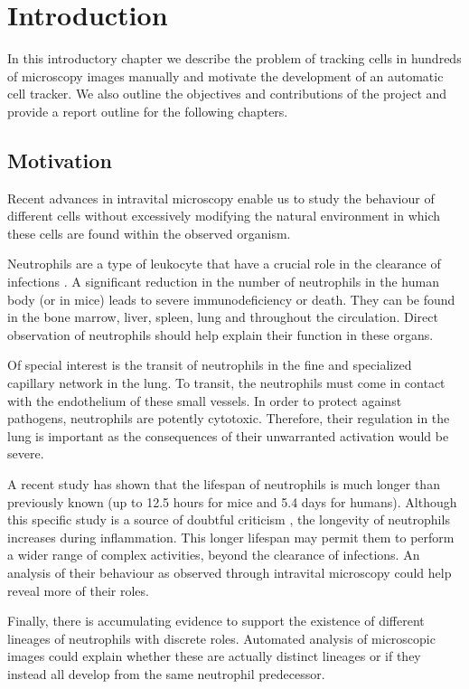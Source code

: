 	\chapter{Introduction \statusfirstdraft}


	In this introductory chapter we describe the problem of tracking cells in hundreds of microscopy images manually and motivate the development of an automatic cell tracker. We also outline the objectives and contributions of the project and provide a report outline for the following chapters.
	
	\section{Motivation \statusfirstdraft}
		
		Recent advances in intravital microscopy enable us to study the behaviour of different cells without excessively modifying the natural environment in which these cells are found within the observed organism. 
			
		Neutrophils are a type of leukocyte that have a crucial role in the clearance of infections \cite{kolku13}. A significant reduction in the number of neutrophils in the human body (or in mice) leads to severe immunodeficiency or death. They can be found in the bone marrow, liver, spleen, lung and throughout the circulation. Direct observation of neutrophils should help explain their function in these organs. 
		
		Of special interest is the transit of neutrophils in the fine and specialized capillary network in the lung. To transit, the neutrophils must come in contact with the endothelium of these small vessels. In order to protect against pathogens, neutrophils are potently cytotoxic. Therefore, their regulation in the lung is important as the consequences of their unwarranted activation would be severe.
		
		A recent study \cite{pillay10} has shown that the lifespan of neutrophils is much longer than previously known (up to 12.5 hours for mice and 5.4 days for humans). Although this specific study is a source of doubtful criticism \cite{toft11}, the longevity of neutrophils increases during inflammation. This longer lifespan may permit them to perform a wider range of complex activities, beyond the clearance of infections. An analysis of their behaviour as observed through intravital microscopy could help reveal more of their roles.
		
		Finally, there is accumulating evidence to support the existence of different lineages of neutrophils with discrete roles. Automated analysis of microscopic images could explain whether these are actually distinct lineages or if they instead all develop from the same neutrophil predecessor.
		
